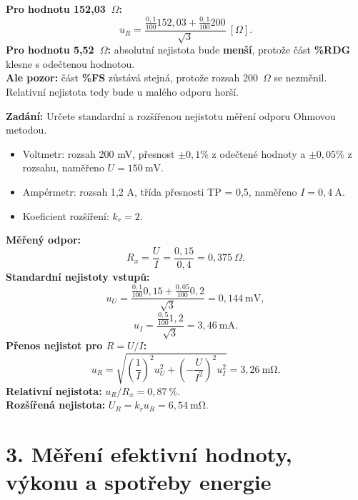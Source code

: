 \documentclass[12pt]{article}
\newcounter{chapternumber}
\newcounter{questionnumber}
\renewcommand{\thequestionnumber}{\arabic{chapternumber}.\arabic{questionnumber}}
\begin{document}
\begin{tcolorbox}[title={\stepcounter{questionnumber}\thequestionnumber. Ohmmetr s pětimístným displejem naměřil odpor 152.03 Ohm. Výrobce uvádí nejistotu pro rozsah 200 Ohm jako: ±0.1\% RDG ± 0.1\% FS. Bude při měření odporu 5.52 Ohm na stejném rozsahu absolutní nejistota měření větší nebo menší? (zdůvodněte). (46–47)}]
\textbf{Pro hodnotu 152{,}03~$\Omega$:}
\[u_R=\frac{\frac{0{,}1}{100}152{,}03+\frac{0{,}1}{100}200}{\sqrt{3}}~[\Omega].\]
\textbf{Pro hodnotu 5{,}52~$\Omega$:} absolutní nejistota bude \textbf{menší}, protože část \textbf{\%RDG} klesne s odečtenou hodnotou.\\
\textbf{Ale pozor:} část \textbf{\%FS} zůstává stejná, protože rozsah 200~$\Omega$ se nezměnil. Relativní nejistota tedy bude u malého odporu horší.
\end{tcolorbox}

\begin{examplebox}[title={Příklad – výpočet nejistoty měření odporu Ohmovou metodou}]
\textbf{Zadání:} Určete standardní a rozšířenou nejistotu měření odporu Ohmovou metodou.
\begin{itemize}
    \item Voltmetr: rozsah 200 mV, přesnost $\pm0{,}1\%$ z odečtené hodnoty a $\pm0{,}05\%$ z rozsahu, naměřeno $U=150~\mathrm{mV}$.
    \item Ampérmetr: rozsah 1{,}2 A, třída přesnosti TP = 0{,}5, naměřeno $I=0{,}4~\mathrm{A}$.
    \item Koeficient rozšíření: $k_r=2$.
\end{itemize}
\textbf{Měřený odpor:}
\[R_x=\frac{U}{I}=\frac{0{,}15}{0{,}4}=0{,}375~\Omega.\]
\textbf{Standardní nejistoty vstupů:}
\[u_U=\frac{\frac{0{,}1}{100}0{,}15+\frac{0{,}05}{100}0{,}2}{\sqrt{3}}=0{,}144~\mathrm{mV},\]
\[u_I=\frac{\frac{0{,}5}{100}1{,}2}{\sqrt{3}}=3{,}46~\mathrm{mA}.\]
\textbf{Přenos nejistot pro $R=U/I$:}
\[u_R=\sqrt{\left(\frac{1}{I}\right)^2u_U^2+\left(-\frac{U}{I^2}\right)^2u_I^2}=3{,}26~\mathrm{m\Omega}.\]
\textbf{Relativní nejistota:} $u_R/R_x=0{,}87~\%$.\\
\textbf{Rozšířená nejistota:} $U_R=k_ru_R=6{,}54~\mathrm{m\Omega}$.
\end{examplebox}


\newpage\section*{3. Měření efektivní hodnoty, výkonu a spotřeby energie}
\setcounter{chapternumber}{3}
\setcounter{questionnumber}{0}
\end{document}
